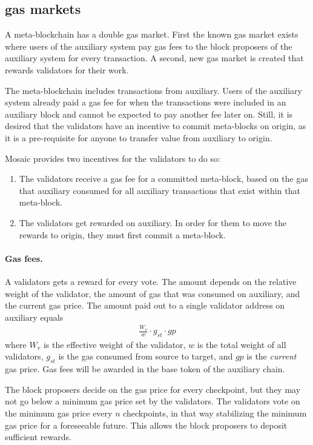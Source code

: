 \documentclass[12pt,a4paper]{article}
\begin{document}
\subsection{gas markets}

A meta-blockchain has a double gas market.
First the known gas market exists where users of the auxiliary system pay gas fees to the block proposers of the auxiliary system for every transaction.
A second, new gas market is created that rewards validators for their work.

The meta-blockchain includes transactions from auxiliary.
Users of the auxiliary system already paid a gas fee for when the transactions were included in an auxiliary block and cannot be expected to pay another fee later on.
Still, it is desired that the validators have an incentive to commit meta-blocks on origin, as it is a pre-requisite for anyone to transfer value from auxiliary to origin.

Mosaic provides two incentives for the validators to do so:

\begin{enumerate}
	\item The validators receive a gas fee for a committed meta-block, based on the gas that auxiliary consumed for all auxiliary transactions that exist within that meta-block.
	\item The validators get rewarded on auxiliary. In order for them to move the rewards to origin, they must first commit a meta-block.
\end{enumerate}

\paragraph{Gas fees.}
A validators gets a reward for every vote.
The amount depends on the relative weight of the validator, the amount of gas that was consumed on auxiliary, and the current gas price.
The amount paid out to a single validator address on auxiliary equals
\begin{align*}
    \frac{W_v}{w} \cdot g_{st} \cdot gp
\end{align*}
where $W_v$ is the effective weight of the validator, $w$ is the total weight of all validators, $g_{st}$ is the gas consumed from source to target, and $gp$ is the \emph{current} gas price.
Gas fees will be awarded in the base token of the auxiliary chain.

The block proposers decide on the gas price for every checkpoint, but they may not go below a minimum gas price set by the validators.
The validators vote on the minimum gas price every $n$ checkpoints, in that way stabilizing the minimum gas price for a foreseeable future.
This allows the block proposers to deposit sufficient rewards.
\end{document}
